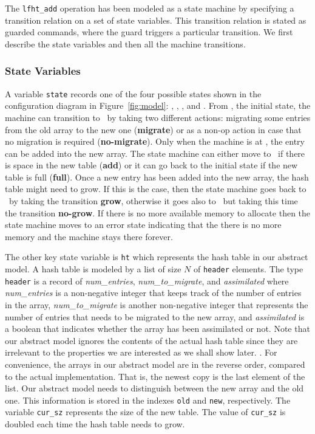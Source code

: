 The \texttt{lfht\_add} operation has been modeled as a state machine
by specifying a transition relation on a set of state variables. This
transition relation is stated as guarded commands, where the guard
triggers a particular transition.  We first describe the state
variables and then all the machine transitions.


\subsubsection{State Variables}

A variable \texttt{state} records one of the four possible states
shown in the configuration diagram in Figure~\ref{fig:model}:
\emph{\pczero}, \emph{\pcone}, \emph{\pctwo}, and \emph{\pcthree}.
%
From \pczero, the initial state, the machine can transition to
\pcone\ by taking two different actions: migrating some entries from
the old array to the new one (\textbf{migrate}) or as a non-op action
in case that no migration is required (\textbf{no-migrate}). Only when
the machine is at \pcone, the entry can be added into the new
array. The state machine can either move to \pctwo\ if there is space
in the new table (\textbf{add}) or it can go back to the initial state
if the new table is full (\textbf{full}). Once a new entry has been
added into the new array, the hash table might need to grow. If this
is the case, then the state machine goes back to \pczero\ by taking
the transition \textbf{grow}, otherwise it goes also to \pczero\ but
taking this time the transition \textbf{no-grow}. If there is no more
available memory to allocate then the state machine moves to an error
state indicating that the there is no more memory and the machine
stays there forever.

The other key state variable is \texttt{ht} which represents the hash
table in our abstract model.  A hash table is modeled by a list of
size $N$ of \texttt{header} elements. The type \texttt{header} is a
record of \emph{num\_entries}, \emph{num\_to\_migrate}, and
\emph{assimilated} where \emph{num\_entries} is a non-negative integer
that keeps track of the number of entries in the array,
\emph{num\_to\_migrate} is another non-negative integer that
represents the number of entries that needs to be migrated to the new
array, and \emph{assimilated} is a boolean that indicates whether the
array has been assimilated or not. Note that our abstract model
ignores the contents of the actual hash table since they are
irrelevant to the properties we are interested as we shall show
later. . For convenience, the arrays in our
abstract model are in the reverse order, compared to the actual
implementation. That is, the newest copy is the last element of the
list.  Our abstract model needs to distinguish between the new array
and the old one. This information is stored in the indexes
\texttt{old} and \texttt{new}, respectively. The variable
\texttt{cur\_sz} represents the size of the new table. The value of
\texttt{cur\_sz} is doubled each time the hash table needs to grow.

